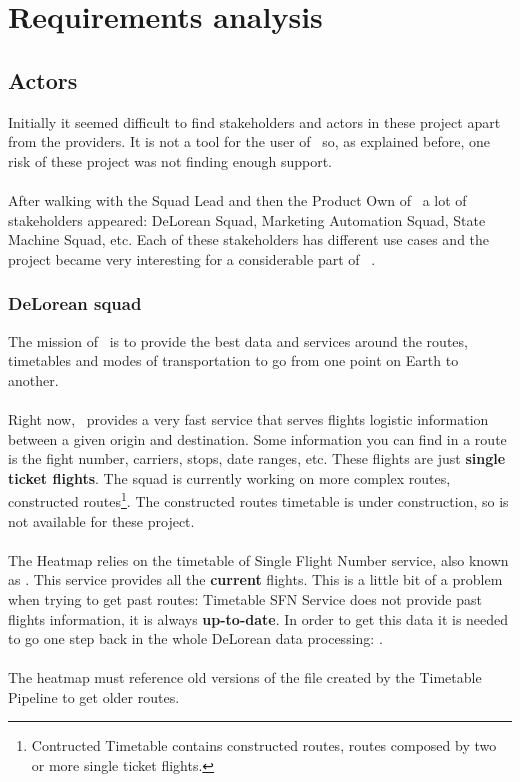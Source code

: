 
\chapter{Requirements analysis}

\label{chapter04}

\section{Actors}

Initially it seemed difficult to find stakeholders and actors in these project apart from the providers. It is not a tool for the user of \company\, so, as explained before, one risk of these project was not finding enough support.
\\\\
After walking with the Squad Lead and then the Product Own of \squad\ a lot of stakeholders appeared: DeLorean Squad, Marketing Automation Squad, State Machine Squad, etc. Each of these stakeholders has different use cases and the project became very interesting for a considerable part of \company\ .

\subsection{DeLorean squad} \label{dlr}

The mission of \squad\ is to provide the best data and services around the routes, timetables and modes of transportation to go from one point on Earth to another.
\\\\
Right now, \squad\ provides a very fast service that serves flights logistic information between a given origin and destination. Some information you can find in a route is the fight number, carriers, stops, date ranges, etc. These flights are just \textbf{single ticket flights}. The squad is currently working on more complex routes, constructed routes\footnote{Contructed Timetable contains constructed routes, routes composed by two or more single ticket flights.}. The constructed routes timetable is under construction, so is not available for these project.
\\\\
The Heatmap relies on the timetable of Single Flight Number service, also known as . This service provides all the \textbf{current} flights. This is a little bit of a problem when trying to get past routes: Timetable SFN Service does not provide past flights information, it is always \textbf{up-to-date}. In order to get this data it is needed to go one step back in the whole DeLorean data processing: .
\\\\
The heatmap must reference old versions of the file created by the Timetable Pipeline to get older routes.

